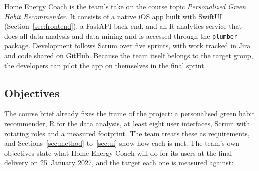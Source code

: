 \documentclass[conference]{IEEEtran}
\newcommand{\pkg}[1]{\texttt{#1}}
\begin{document}
Home Energy Coach is the team's take on the course topic \emph{Personalized Green Habit Recommender}. It consists of a native iOS app built with SwiftUI (Section~\ref{sec:frontend}), a FastAPI back-end, and an R analytics service that does all data analysis and data mining and is accessed through the \pkg{plumber} package. Development follows Scrum over five sprints, with work tracked in Jira and code shared on GitHub. Because the team itself belongs to the target group, the developers can pilot the app on themselves in the final sprint.

\subsection{Objectives}
\label{sec:objectives}
The course brief already fixes the frame of the project: a personalised green habit recommender, R for the data analysis, at least eight user interfaces, Scrum with rotating roles and a measured footprint. The team treats these as requirements, and Sections~\ref{sec:method} to~\ref{sec:ui} show how each is met. The team's own objectives state what Home Energy Coach will do for its users at the final delivery on 25~January 2027, and the target each one is measured against:
\end{document}
